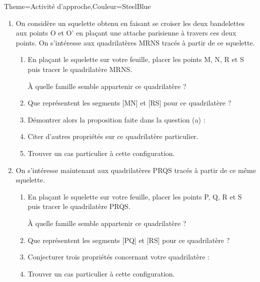 \begin{Maquette}[Cours]{Theme={Activité d'approche},Couleur={SteelBlue}}
\begin{AActivite}
         \begin{enumerate}
            \item On considère un squelette obtenu en faisant se croiser les deux bandelettes aux points O et O' en plaçant une attache parisienne à travers ces deux points. On s'intéresse aux quadrilatères MRNS tracés à partir de ce squelette.
               \begin{enumerate}
                  \item En plaçant le squelette sur votre feuille, placer les points M, N, R et S puis tracer le quadrilatère MRNS. \par
                     À quelle famille semble appartenir ce quadrilatère ? \pointilles
                  \item Que représentent les segments [MN] et [RS] pour ce quadrilatère ? \pointilles
                  \item Démontrer alors la proposition faite dans la question (a) : \pointilles \par
                     \pointilles 
                  \item Citer d'autres propriétés sur ce quadrilatère particulier. \pointilles \par
                     \pointilles \par
                     \pointilles
                  \item Trouver un cas particulier à cette configuration. \pointilles \par
                     \pointilles
               \end{enumerate}
            \item On s'intéresse maintenant aux quadrilatères PRQS tracés à partir de ce même squelette.
               \begin{enumerate}
                  \item En plaçant le squelette sur votre feuille, placer les points P, Q, R et S puis tracer le quadrilatère PRQS. \par 
                     À quelle famille semble appartenir ce quadrilatère ? \pointilles
                  \item Que représentent les segments [PQ] et [RS] pour ce quadrilatère ? \pointilles
                  \item Conjecturer trois propriétés concernant votre quadrilatère : \pointilles \par
                     \pointilles \par
                     \pointilles
                  \item Trouver un cas particulier à cette configuration. \pointilles \par
                     \pointilles
               \end{enumerate}
         \end{enumerate}


\end{AActivite}
\end{Maquette}
